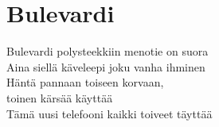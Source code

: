 \section{Bulevardi}

Bulevardi polysteekkiin menotie on suora\\
Aina siellä käveleepi joku vanha ihminen\\
Häntä pannaan toiseen korvaan,\\ toinen kärsää käyttää\\
Tämä uusi telefooni kaikki toiveet täyttää